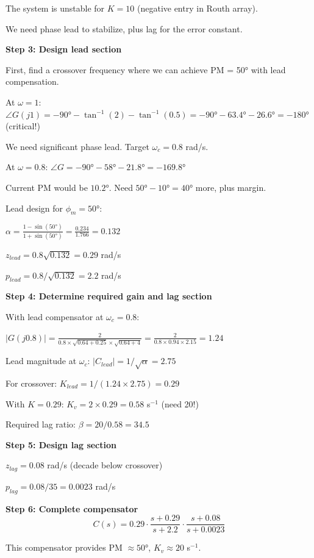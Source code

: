 The system is unstable for $K = 10$ (negative entry in Routh array).

We need phase lead to stabilize, plus lag for the error constant.

\textbf{Step 3: Design lead section}

First, find a crossover frequency where we can achieve PM = 50° with lead compensation.

At $\omega = 1$: $\angle G(j1) = -90° - \tan^{-1}(2) - \tan^{-1}(0.5) = -90° - 63.4° - 26.6° = -180°$ (critical!)

We need significant phase lead. Target $\omega_c = 0.8$ rad/s.

At $\omega = 0.8$: $\angle G = -90° - 58° - 21.8° = -169.8°$

Current PM would be $10.2°$. Need $50° - 10° = 40°$ more, plus margin.

Lead design for $\phi_m = 50°$:

$\alpha = \frac{1 - \sin(50°)}{1 + \sin(50°)} = \frac{0.234}{1.766} = 0.132$

$z_{lead} = 0.8\sqrt{0.132} = 0.29$ rad/s

$p_{lead} = 0.8/\sqrt{0.132} = 2.2$ rad/s

\textbf{Step 4: Determine required gain and lag section}

With lead compensator at $\omega_c = 0.8$:

$|G(j0.8)| = \frac{2}{0.8 \times \sqrt{0.64+0.25} \times \sqrt{0.64+4}} = \frac{2}{0.8 \times 0.94 \times 2.15} = 1.24$

Lead magnitude at $\omega_c$: $|C_{lead}| = 1/\sqrt{\alpha} = 2.75$

For crossover: $K_{lead} = 1/(1.24 \times 2.75) = 0.29$

With $K = 0.29$: $K_v = 2 \times 0.29 = 0.58$ s$^{-1}$ (need 20!)

Required lag ratio: $\beta = 20/0.58 = 34.5$

\textbf{Step 5: Design lag section}

$z_{lag} = 0.08$ rad/s (decade below crossover)

$p_{lag} = 0.08/35 = 0.0023$ rad/s

\textbf{Step 6: Complete compensator}
\begin{equation}
C(s) = 0.29 \cdot \frac{s + 0.29}{s + 2.2} \cdot \frac{s + 0.08}{s + 0.0023}
\end{equation}

This compensator provides PM $\approx 50°$, $K_v \approx 20$ s$^{-1}$.

